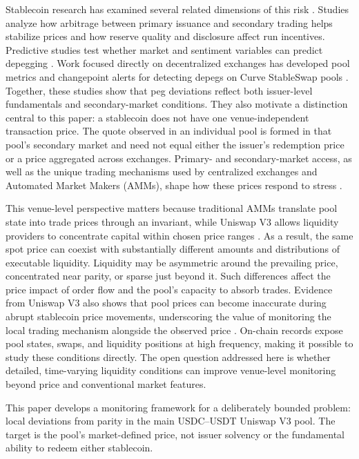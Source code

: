 \documentclass[a4paper,fleqn]{cas-sc}
\begin{document}
Stablecoin research has examined several related dimensions of this risk \citep{mahrous_2025_stablecoins}. Studies analyze how arbitrage between primary issuance and secondary trading helps stabilize prices \citep{Lyons2023} and how reserve quality and disclosure affect run incentives. Predictive studies test whether market and sentiment variables can predict depegging \citep{stablecoin_depeg_prediction}. Work focused directly on decentralized exchanges has developed pool metrics and changepoint alerts for detecting depegs on Curve StableSwap pools \citep{cintra2023}. Together, these studies show that peg deviations reflect both issuer-level fundamentals and secondary-market conditions. They also motivate a distinction central to this paper: a stablecoin does not have one venue-independent transaction price. The quote observed in an individual pool is formed in that pool's secondary market and need not equal either the issuer's redemption price or a price aggregated across exchanges. Primary- and secondary-market access, as well as the unique trading mechanisms used by centralized exchanges and Automated Market Makers (AMMs), shape how these prices respond to stress \citep{Watsky2024}.

This venue-level perspective matters because traditional AMMs translate pool state into trade prices through an invariant, while Uniswap V3 allows liquidity providers to concentrate capital within chosen price ranges \citep{uniswap_whitepaper}. As a result, the same spot price can coexist with substantially different amounts and distributions of executable liquidity. Liquidity may be asymmetric around the prevailing price, concentrated near parity, or sparse just beyond it. Such differences affect the price impact of order flow and the pool's capacity to absorb trades. Evidence from Uniswap V3 also shows that pool prices can become inaccurate during abrupt stablecoin price movements, underscoring the value of monitoring the local trading mechanism alongside the observed price \citep{Heimbach2022}. On-chain records expose pool states, swaps, and liquidity positions at high frequency, making it possible to study these conditions directly. The open question addressed here is whether detailed, time-varying liquidity conditions can improve venue-level monitoring beyond price and conventional market features.

This paper develops a monitoring framework for a deliberately bounded problem: local deviations from parity in the main USDC--USDT Uniswap V3 pool. The target is the pool's market-defined price, not issuer solvency or the fundamental ability to redeem either stablecoin.
\end{document}
